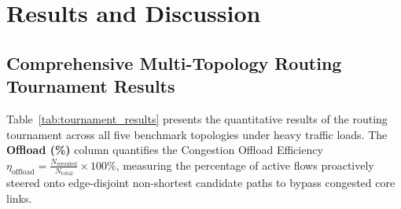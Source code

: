 \documentclass[12pt,a4paper,oneside]{report}
\begin{document}
\section{Results and Discussion}
\label{sec:results}

\subsection{Comprehensive Multi-Topology Routing Tournament Results}
Table~\ref{tab:tournament_results} presents the quantitative results of the routing tournament across all five benchmark topologies under heavy traffic loads. The \textbf{Offload (\%)} column quantifies the Congestion Offload Efficiency $\eta_{\text{offload}} = \frac{N_{\text{rerouted}}}{N_{\text{total}}} \times 100\%$, measuring the percentage of active flows proactively steered onto edge-disjoint non-shortest candidate paths to bypass congested core links.
\end{document}
